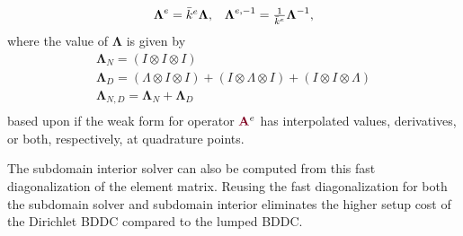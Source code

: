 \begin{definition}
\begin{equation}
\begin{array}{c c}
\boldsymbol{\Lambda}^e = \bar{k}^e \boldsymbol{\Lambda},  &  \boldsymbol{\Lambda}^{e, -1} = \frac{1}{\bar{k}^e} \boldsymbol{\Lambda}^{-1},
\end{array}
\end{equation}
where the value of $\mathbf{\Lambda}$ is given by
\begin{equation}
\begin{array}{c}
\boldsymbol{\Lambda}_N      = \left( I \otimes I \otimes I \right)  \\
\boldsymbol{\Lambda}_D      = \left( \Lambda \otimes I \otimes I\right) + \left( I \otimes \Lambda \otimes I\right) + \left( I \otimes I \otimes \Lambda \right)  \\
\boldsymbol{\Lambda}_{N, D} = \boldsymbol{\Lambda}_N + \boldsymbol{\Lambda}_D  \\
\end{array}
\end{equation}
based upon if the weak form for operator ${\color{burgundy}\mathbf{A}}^e$ has interpolated values, derivatives, or both, respectively, at quadrature points.
\end{definition}

The subdomain interior solver can also be computed from this fast diagonalization of the element matrix.
Reusing the fast diagonalization for both the subdomain solver and subdomain interior eliminates the higher setup cost of the Dirichlet BDDC compared to the lumped BDDC.

